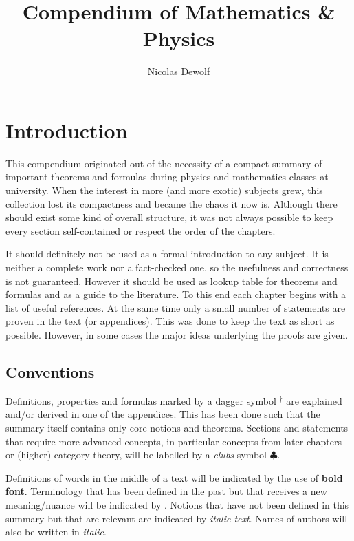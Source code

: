 \documentclass[11pt, a4paper]{report}
\begin{document}
\reversemarginpar
\setcounter{tocdepth}{2}

\title{Compendium of Mathematics \& Physics}
\author{Nicolas Dewolf}
\maketitle

\tableofcontents

\chapter{Introduction}

    This compendium originated out of the necessity of a compact summary of important theorems and formulas during physics and mathematics classes at university. When the interest in more (and more exotic) subjects grew, this collection lost its compactness and became the chaos it now is. Although there should exist some kind of overall structure, it was not always possible to keep every section self-contained or respect the order of the chapters.

    It should definitely not be used as a formal introduction to any subject. It is neither a complete work nor a fact-checked one, so the usefulness and correctness is not guaranteed. However it should be used as lookup table for theorems and formulas and as a guide to the literature. To this end each chapter begins with a list of useful references. At the same time only a small number of statements are proven in the text (or appendices). This was done to keep the text as short as possible. However, in some cases the major ideas underlying the proofs are given.

\section{Conventions}

    Definitions, properties and formulas marked by a dagger symbol $^\dag$ are explained and/or derived in one of the appendices. This has been done such that the summary itself contains only core notions and theorems. Sections and statements that require more advanced concepts, in particular concepts from later chapters or (higher) category theory, will be labelled by a \textit{clubs} symbol $\clubsuit$.

    Definitions of words in the middle of a text will be indicated by the use of \textbf{bold font}. Terminology that has been defined in the past but that receives a new meaning/nuance will be indicated by . Notions that have not been defined in this summary but that are relevant are indicated by \textit{italic text}. Names of authors will also be written in \textit{italic}.
\end{document}
